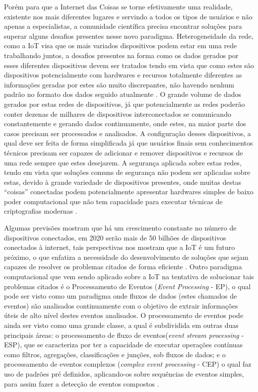 \documentclass[ti,table]{texufpel} %
\begin{document}
Porém para que a Internet das Coisas se torne efetivamente uma realidade, existente nos mais diferentes lugares e servindo a todos os tipos de usuários e não apenas a especialistas, a comunidade científica precisa encontrar soluções para superar alguns desafios presentes nesse novo paradigma. Heterogeneidade da rede, como a IoT visa que os mais variados dispositivos podem estar em uma rede trabalhando juntos, a desafios presentes na forma como os dados gerados por esses diferentes dispositivos devem ser tratados tendo em vista que como estes são dispositivos potencialmente com hardwares e recursos totalmente diferentes as informações geradas por estes são muito discrepantes, não havendo nenhum padrão no formato dos dados seguido atualmente \cite{agrawal2013survey}. O grande volume de dados gerados por estas redes de dispositivos, já que potencialmente as redes poderão conter dezenas de milhares de dispositivos interconectados se comunicando constantemente e gerando dados continuamente, onde estes, na maior parte dos casos precisam ser processados e analisados. A configuração desses dispositivos, a qual deve ser feita de forma simplificada já que usuários finais sem conhecimentos técnicos precisam ser capazes de adicionar e remover dispositivos e recursos de uma rede sempre que estes desejarem. A segurança aplicada sobre estas redes, tendo em vista que soluções comuns de segurança não podem ser aplicadas sobre estas,  devido à grande variedade de dispositivos presentes, onde muitas destas ``coisas'' conectadas podem potencialmente apresentar hardwares simples de baixo poder computacional que não tem capacidade para executar técnicas de criptografias modernas \cite{agrawal2013survey}. 

  

  

Algumas previsões mostram que há um crescimento constante no número de dispositivos conectados, em 2020 serão mais de 50 bilhões de dispositivos conectados à internet, tais perspectivas nos mostram que a IoT é um futuro próximo, o que enfatiza a necessidade do desenvolvimento de soluções que sejam capazes de resolver os problemas citados de forma eficiente \cite{xavier2016smart}. Outro paradigma computacional que vem sendo aplicado sobre a IoT na tentativa de solucionar tais problemas citados é o  Processamento de Eventos (\textit{Event Processing} - EP), o qual pode ser visto como um paradigma onde fluxos de dados (estes chamados de eventos) são analisados continuamente com o objetivo de extrair informações úteis de alto nível destes eventos analisados. O processamento de eventos pode ainda ser visto como uma grande classe, a qual é subdividida em outras duas principais áreas: o processamento de fluxo de eventos(\textit{event stream processing} - ESP), que se caracteriza por ter a capacidade de executar operações contínuas como filtros, agregações, classificações e junções, sob fluxos de dados; e o processamento de eventos complexos (\textit{complex event processing} - CEP) o qual faz uso de padrões pré definidos, aplicando-os sobre sequências de eventos simples, para assim fazer a detecção de eventos compostos \cite{dayarathna2018recent}. 
\end{document}
